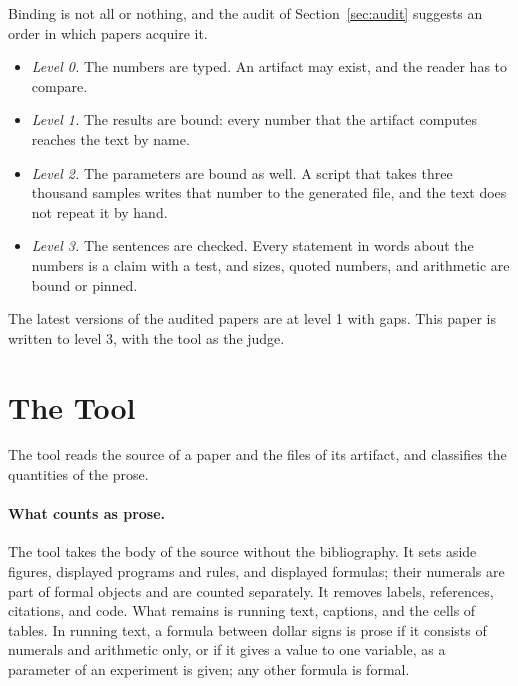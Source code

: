\documentclass[acmsmall,nonacm,screen]{acmart}
\begin{document}
Binding is not all or nothing, and the audit of Section~\ref{sec:audit} suggests an order in
which papers acquire it.
\begin{itemize}
\item \emph{Level 0.} The numbers are typed. An artifact may exist, and the reader has to
  compare.
\item \emph{Level 1.} The results are bound: every number that the artifact computes reaches
  the text by name.
\item \emph{Level 2.} The parameters are bound as well. A script that takes three thousand
  samples writes that number to the generated file, and the text does not repeat it by hand.
\item \emph{Level 3.} The sentences are checked. Every statement in words about the numbers
  is a claim with a test, and sizes, quoted numbers, and arithmetic are bound or pinned.
\end{itemize}
The latest versions of the audited papers are at level 1 with gaps. This paper is written to
level 3, with the tool as the judge.

\section{The Tool}
\label{sec:tool}

The tool reads the source of a paper and the files of its artifact, and classifies the
quantities of the prose.

\paragraph{What counts as prose.} The tool takes the body of the source without the
bibliography. It sets aside figures, displayed programs and rules, and displayed formulas;
their numerals are part of formal objects and are counted separately. It removes labels,
references, citations, and code. What remains is running text, captions, and the cells of
tables. In running text, a formula between dollar signs is prose if it consists of numerals
and arithmetic only, or if it gives a value to one variable, as a parameter of an experiment
is given; any other formula is formal.
\end{document}
